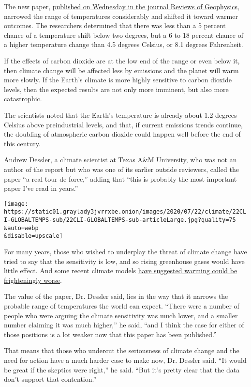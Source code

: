 The new paper,
\href{https://agupubs.onlinelibrary.wiley.com/doi/abs/10.1029/2019RG000678}{published
on Wednesday in the journal Reviews of Geophysics}, narrowed the range
of temperatures considerably and shifted it toward warmer outcomes. The
researchers determined that there was less than a 5 percent chance of a
temperature shift below two degrees, but a 6 to 18 percent chance of a
higher temperature change than 4.5 degrees Celsius, or 8.1 degrees
Fahrenheit.

If the effects of carbon dioxide are at the low end of the range or even
below it, then climate change will be affected less by emissions and the
planet will warm more slowly. If the Earth's climate is more highly
sensitive to carbon dioxide levels, then the expected results are not
only more imminent, but also more catastrophic.

The scientists noted that the Earth's temperature is already about 1.2
degrees Celsius above preindustrial levels, and that, if current
emissions trends continue, the doubling of atmospheric carbon dioxide
could happen well before the end of this century.

Andrew Dessler, a climate scientist at Texas A\&M University, who was
not an author of the report but who was one of its earlier outside
reviewers, called the paper ``a real tour de force,'' adding that ``this
is probably the most important paper I've read in years.''

\texttt{[image: https://static01.graylady3jvrrxbe.onion/images/2020/07/22/climate/22CLI-GLOBALTEMPS-sub/22CLI-GLOBALTEMPS-sub-articleLarge.jpg?quality=75\\\&auto=webp\\\&disable=upscale]}

For many years, those who wished to underplay the threat of climate
change have tried to say that the sensitivity is low, and so rising
greenhouse gases would have little effect. And some recent climate
models
\href{https://www.yaleclimateconnections.org/2020/07/some-new-climate-models-are-projecting-extreme-warming-are-they-correct/}{have
suggested warming could be frighteningly worse}.

The value of the paper, Dr. Dessler said, lies in the way that it
narrows the probable range of temperatures the world can expect. ``There
were a number of people who were arguing the climate sensitivity was
much lower, and a smaller number claiming it was much higher,'' he said,
``and I think the case for either of those positions is a lot weaker now
that this paper has been published.''

That means that those who undercut the seriousness of climate change and
the need for action have a much harder case to make now, Dr. Dessler
said. ``It would be great if the skeptics were right,'' he said. ``But
it's pretty clear that the data don't support that contention.''

